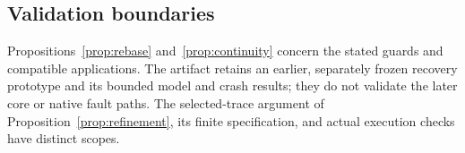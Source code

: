 \subsection{Validation boundaries}
Propositions~\ref{prop:rebase} and~\ref{prop:continuity} concern the stated
guards and compatible applications. The artifact retains an earlier,
separately frozen recovery prototype and its bounded model and crash
results; they do not validate the later core or native fault paths.
The selected-trace argument of Proposition~\ref{prop:refinement}, its
finite specification, and actual execution checks have distinct scopes.
